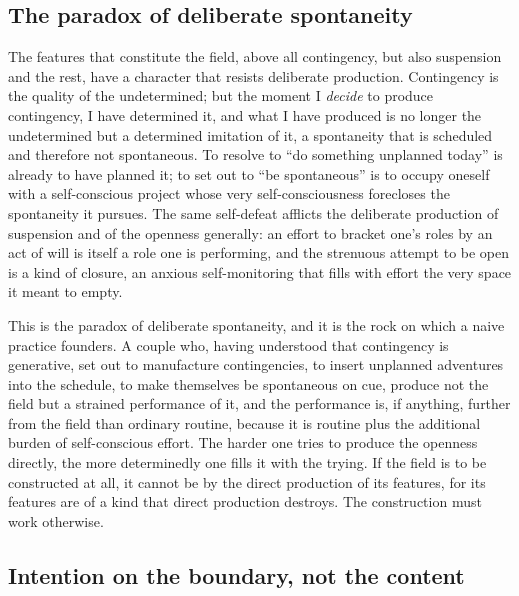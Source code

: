 \subsection{The paradox of deliberate spontaneity}
\label{p21:sub:constr-paradox}

The features that constitute the field, above all contingency, but also suspension and the rest, have a character that resists deliberate production. Contingency is the quality of the undetermined; but the moment I \emph{decide} to produce contingency, I have determined it, and what I have produced is no longer the undetermined but a determined imitation of it, a spontaneity that is scheduled and therefore not spontaneous. To resolve to ``do something unplanned today'' is already to have planned it; to set out to ``be spontaneous'' is to occupy oneself with a self-conscious project whose very self-consciousness forecloses the spontaneity it pursues. The same self-defeat afflicts the deliberate production of suspension and of the openness generally: an effort to bracket one's roles by an act of will is itself a role one is performing, and the strenuous attempt to be open is a kind of closure, an anxious self-monitoring that fills with effort the very space it meant to empty.

This is the paradox of deliberate spontaneity, and it is the rock on which a naive practice founders. A couple who, having understood that contingency is generative, set out to manufacture contingencies, to insert unplanned adventures into the schedule, to make themselves be spontaneous on cue, produce not the field but a strained performance of it, and the performance is, if anything, further from the field than ordinary routine, because it is routine plus the additional burden of self-conscious effort. The harder one tries to produce the openness directly, the more determinedly one fills it with the trying. If the field is to be constructed at all, it cannot be by the direct production of its features, for its features are of a kind that direct production destroys. The construction must work otherwise.

\subsection{Intention on the boundary, not the content}
\label{p21:sub:constr-boundary}

